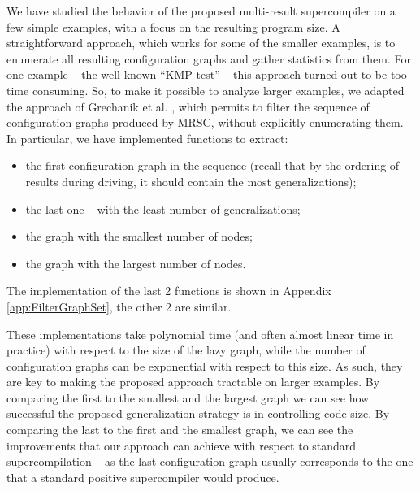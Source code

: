 \documentclass[submission,copyright,creativecommons]{eptcs}
\newif\ifVptVer
\begin{document}
We have studied the behavior of the proposed multi-result supercompiler on a few simple
examples, with a focus on the resulting program size.
A straightforward approach, which works for some of the smaller examples,
is to enumerate all resulting configuration graphs and gather statistics from them.
For one example -- the well-known ``KMP test'' -- this approach turned out to be too
time consuming.
So, to make it possible to analyze larger examples, we adapted the approach 
of Grechanik et al. \cite{Romanenko2014StagedMRSC}, which permits to filter
the sequence of configuration graphs produced by MRSC, without explicitly
enumerating them.
In particular, we have implemented functions to extract:
\begin{itemize}
  \item the first configuration graph in the sequence (recall that by the ordering of 
    results during driving, it should contain the most generalizations);
  \item the last one -- with the least number of generalizations;
  \item the graph with the smallest number of nodes;
  \item the graph with the largest number of nodes.
\end{itemize}
\ifVptVer
The implementation of some of these functions is shown in
the extended version of this article \cite{krustev2020controlling}.
\else
The implementation of the last 2 functions is shown in
Appendix \ref{app:FilterGraphSet},
the other 2 are similar.
\fi
These implementations take polynomial time (and often almost linear time in practice)  
with respect to the size of the lazy graph,
while the number of configuration graphs can be exponential with respect to this size.
As such, they are key to making the proposed approach tractable on larger examples.
By comparing the first to the smallest and the largest graph we can see how 
successful the proposed generalization strategy is in controlling code size.
By comparing the last to the first and the smallest graph, we can see the improvements
that our approach can achieve with respect to standard supercompilation --
as the last configuration graph usually corresponds to the one that a standard positive supercompiler would produce.
\end{document}
